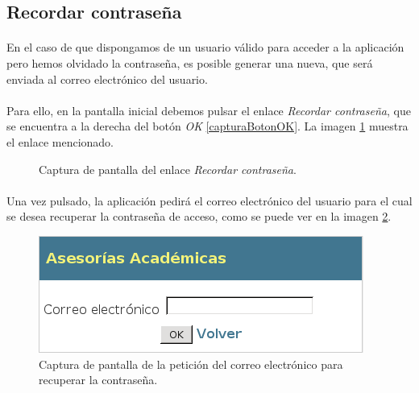 \subsection{Recordar contraseña}

  \paragraph{}En el caso de que dispongamos de un usuario válido para acceder a
  la aplicación pero hemos olvidado la contraseña, es posible generar una nueva,
  que será enviada al correo electrónico del usuario.

  \paragraph{}Para ello, en la pantalla inicial debemos pulsar el enlace
  \textit{Recordar contraseña}, que se encuentra a la derecha del botón
  \textit{OK} \ref{capturaBotonOK}. La imagen \ref{capturaRecordarPassword}
  muestra el enlace mencionado.

  \begin{figure}[!ht]
    \begin{center}
      \caption{Captura de pantalla del enlace \textit{Recordar contraseña}.}
      \label{capturaRecordarPassword}
    \end{center}
  \end{figure}

  \paragraph{}Una vez pulsado, la aplicación pedirá el correo electrónico del
  usuario para el cual se desea recuperar la contraseña de acceso, como se puede
  ver en la imagen \ref{capturaPedirCorreo}.

  \begin{figure}[!ht]
    \begin{center}
      \includegraphics[]{4.Funcionamiento_Aplicacion/4.2.Acceso_Sistema/4.2.1.Recordar_Password/Capturas/pedir_correo.png}
      \caption{Captura de pantalla de la petición del correo electrónico para recuperar la contraseña.}
      \label{capturaPedirCorreo}
    \end{center}
  \end{figure}

